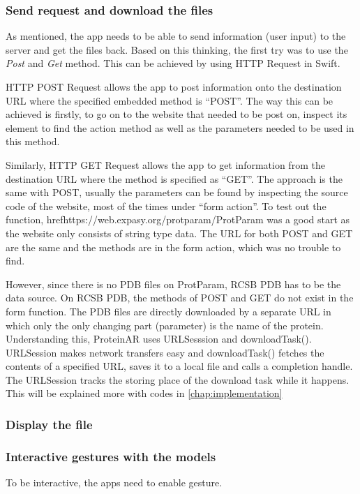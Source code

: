 	\subsubsection{Send request and download the files}
As mentioned, the app needs to be able to send information (user input) to the server and get the files back. Based on this thinking, the first try was to use the \emph{Post} and \emph{Get} method. This can be achieved by using HTTP Request in Swift. 

HTTP POST Request allows the app to post information onto the destination URL where the specified embedded method is “POST”. The way this can be achieved is firstly, to go on to the website that needed to be post on, inspect its element to find the action method as well as the parameters needed to be used in this method. 

Similarly, HTTP GET Request allows the app to get information from the destination URL where the method is specified as “GET”. The approach is the same with POST, usually the parameters can be found by inspecting the source code of the website, most of the times under “form action”.
To test out the function, href{https://web.expasy.org/protparam/}{ProtParam} was a good start as the website only consists of string type data. The URL for both POST and GET are the same and the methods are in the form action, which was no trouble to find. 

However, since there is no PDB files on ProtParam, RCSB PDB has to be the data source. On RCSB PDB, the methods of POST and GET do not exist in the form function. The PDB files are directly downloaded by a separate URL in which only the only changing part (parameter) is the name of the protein. Understanding this, ProteinAR uses URLSesssion and downloadTask(). URLSession makes network transfers easy and downloadTask() fetches the contents of a specified URL, saves it to a local file and calls a completion handle. The URLSession tracks the storing place of the download task while it happens. This will be explained more with codes in \autoref{chap:implementation}
	\subsubsection{Display the file}
 	\subsubsection{Interactive gestures with the models}
To be interactive, the apps need to enable gesture.

